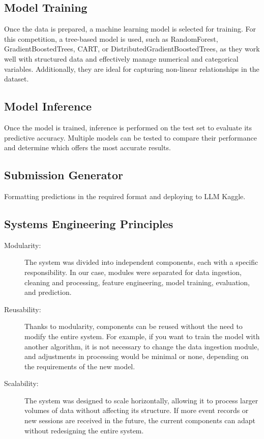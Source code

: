 \documentclass{article}
\begin{document}
\subsection*{Model Training}

Once the data is prepared, a machine learning model is selected for training. For this competition, a tree-based model is used, such as RandomForest, GradientBoostedTrees, CART, or DistributedGradientBoostedTrees, as they work well with structured data and effectively manage numerical and categorical variables. Additionally, they are ideal for capturing non-linear relationships in the dataset.

\subsection*{Model Inference}

Once the model is trained, inference is performed on the test set to evaluate its predictive accuracy. Multiple models can be tested to compare their performance and determine which offers the most accurate results.

\subsection*{Submission Generator}

Formatting predictions in the required format
and deploying to LLM Kaggle.

\subsection*{Systems Engineering Principles}

\begin{description}
  \item[Modularity:] The system was divided into independent components, each with a specific responsibility. In our case, modules were separated for data ingestion, cleaning and processing, feature engineering, model training, evaluation, and prediction.
  
  \item[Reusability:] Thanks to modularity, components can be reused without the need to modify the entire system. For example, if you want to train the model with another algorithm, it is not necessary to change the data ingestion module, and adjustments in processing would be minimal or none, depending on the requirements of the new model.
  
  \item[Scalability:] The system was designed to scale horizontally, allowing it to process larger volumes of data without affecting its structure. If more event records or new sessions are received in the future, the current components can adapt without redesigning the entire system.
\end{description}
\end{document}
